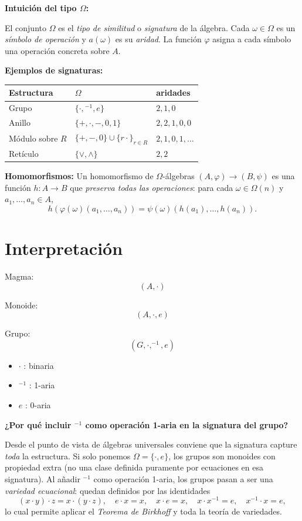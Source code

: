 \documentclass[12pt]{article}
\begin{document}
\begin{tcolorbox}[iabox]
\textbf{Intuición del tipo $\Omega$:}

El conjunto $\Omega$ es el \emph{tipo de similitud} o \emph{signatura} de la álgebra. Cada $\omega\in\Omega$ es un \emph{símbolo de operación} y $a(\omega)$ es su \emph{aridad}. La función $\varphi$ asigna a cada símbolo una operación concreta sobre $A$.

\medskip
\textbf{Ejemplos de signaturas:}
\begin{center}
\begin{tabular}{l|l|l}
Estructura & $\Omega$ & aridades \\\hline
Grupo & $\{\cdot,{}^{-1},e\}$ & $2,1,0$ \\
Anillo & $\{+,\cdot,-,0,1\}$ & $2,2,1,0,0$ \\
Módulo sobre $R$ & $\{+,-,0\}\cup\{r\cdot\}_{r\in R}$ & $2,1,0,1,\dots$ \\
Retículo & $\{\vee,\wedge\}$ & $2,2$
\end{tabular}
\end{center}

\textbf{Homomorfismos:} Un homomorfismo de $\Omega$-álgebras $(A,\varphi)\to(B,\psi)$ es una función $h:A\to B$ que \emph{preserva todas las operaciones}: para cada $\omega\in\Omega(n)$ y $a_1,\dots,a_n\in A$,
\[
  h(\varphi(\omega)(a_1,\dots,a_n)) = \psi(\omega)(h(a_1),\dots,h(a_n)).
\]
\end{tcolorbox}

\section*{Interpretación}

Magma:
\[
(A,\cdot)
\]

Monoide:
\[
(A,\cdot,e)
\]

Grupo:
\[
(G,\cdot,^{-1},e)
\]

\begin{itemize}
\item $\cdot$ : binaria
\item $^{-1}$ : 1-aria
\item $e$ : 0-aria
\end{itemize}

\begin{tcolorbox}[iabox]
\textbf{¿Por qué incluir ${}^{-1}$ como operación 1-aria en la signatura del grupo?}

Desde el punto de vista de álgebras universales conviene que la signatura capture \emph{toda} la estructura. Si solo ponemos $\Omega=\{\cdot,e\}$, los grupos son monoides con propiedad extra (no una clase definida puramente por ecuaciones en esa signatura). Al añadir ${}^{-1}$ como operación 1-aria, los grupos pasan a ser una \emph{variedad ecuacional}: quedan definidos por las identidades
\[
  (x\cdot y)\cdot z = x\cdot(y\cdot z),\quad e\cdot x=x,\quad x\cdot e=x,\quad x\cdot x^{-1}=e,\quad x^{-1}\cdot x=e,
\]
lo cual permite aplicar el \emph{Teorema de Birkhoff} y toda la teoría de variedades.
\end{tcolorbox}
\end{document}
